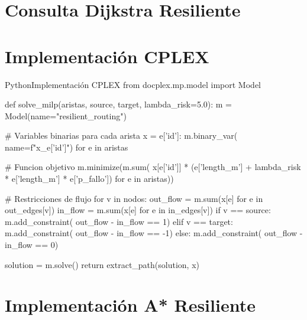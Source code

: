 \documentclass[conference]{IEEEtran}
\begin{document}
\section{Consulta Dijkstra Resiliente}
\label{app:dijkstra_resiliente}


\section{Implementación CPLEX}
\label{app:cplex}

\begin{mycode}{Python}{Implementación CPLEX}
from docplex.mp.model import Model

def solve_milp(aristas, source, target,
               lambda_risk=5.0):
    m = Model(name="resilient_routing")

    # Variables binarias para cada arista
    x = {e['id']: m.binary_var(
        name=f"x_{e['id']}")
         for e in aristas}

    # Funcion objetivo
    m.minimize(m.sum(
        x[e['id']] * (e['length_m'] +
            lambda_risk * e['length_m']
            * e['p_fallo'])
        for e in aristas))

    # Restricciones de flujo
    for v in nodos:
        out_flow = m.sum(x[e] for e
                         in out_edges[v])
        in_flow = m.sum(x[e] for e
                        in in_edges[v])
        if v == source:
            m.add_constraint(
                out_flow - in_flow == 1)
        elif v == target:
            m.add_constraint(
                out_flow - in_flow == -1)
        else:
            m.add_constraint(
                out_flow - in_flow == 0)

    solution = m.solve()
    return extract_path(solution, x)
\end{mycode}

\section{Implementación A* Resiliente}
\label{app:astar}
\end{document}
